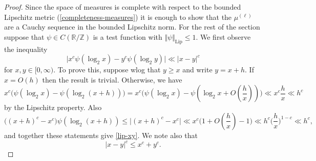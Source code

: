\documentclass[10pt,a4paper]{amsart}
\newcommand\Lip{\operatorname{Lip}}
\newcommand\R{\mathbb{R}}
\newcommand\Z{\mathbb{Z}}
\renewcommand{\ge}{\geqslant}
\renewcommand{\le}{\leqslant}
\begin{document}
\begin{proof} Since the space of measures is complete with respect to the bounded Lipschitz metric (\cref{completeness-measures}) it is enough to show that the $\mu^{(\ell)}$ are a Cauchy sequence in the bounded Lipschitz norm. For the rest of the section suppose that $\psi \in C(\R/\Z)$ is a test function with $\Vert \psi \Vert_{\Lip} \le 1$.
We first observe the inequality 
\begin{equation}\label{lip-xy} \big| x^c \psi(\log_2 x) - y^c \psi(\log_2 y) \big| \ll |x - y|^c\end{equation} for $x,y \in [0,\infty)$. To prove this, suppose wlog that $y \ge x$ and write $y = x + h$. If $x = O(h)$ then the result is trivial. Otherwise, we have
\[ x^c \big( \psi (\log_2 x) - \psi(\log_2(x + h))\big) = x^c \big( \psi(\log_2 x) - \psi(\log_2 x + O(\frac{h}{x})) \big) \ll x^c \frac{h}{x} \ll h^c\] by the Lipschitz property. Also
\[ \big( (x + h)^c - x^c\big) \psi(\log_2(x + h)) \le \big| (x + h)^c - x^c\big| \ll x^c \big(1 + O(\frac{h}{x}) - 1\big) \ll h^c \big( \frac{h}{x}\big)^{1 - c} \ll h^c,\] and together these statements give \cref{lip-xy}. 
We note also that
\begin{equation}\label{simple-real-var} |x - y|^c \le x^c + y^c.\end{equation}


\end{proof}
\end{document}
